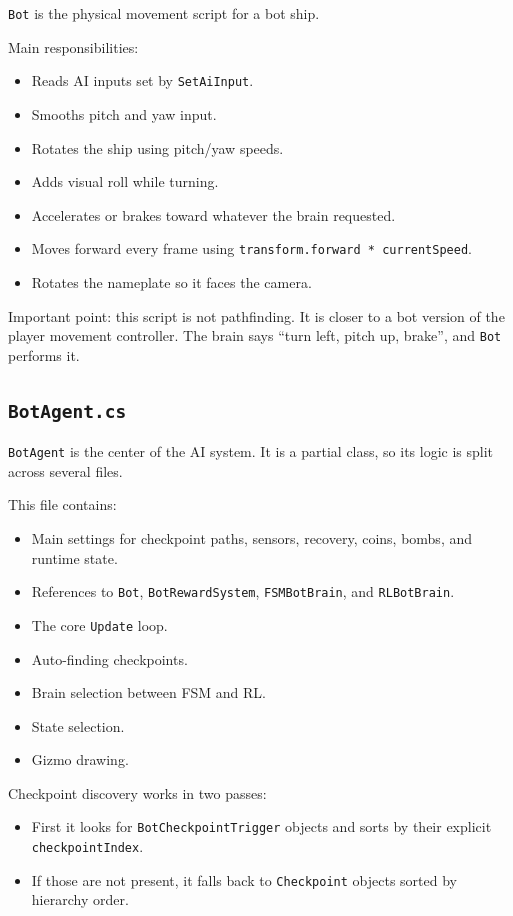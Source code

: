 \documentclass[11pt]{article}
\newcommand{\file}[1]{\texttt{#1}}
\newcommand{\code}[1]{{\footnotesize\texttt{#1}}}
\begin{document}
\code{Bot} is the physical movement script for a bot ship.

Main responsibilities:

\begin{itemize}
    \item Reads AI inputs set by \code{SetAiInput}.
    \item Smooths pitch and yaw input.
    \item Rotates the ship using pitch/yaw speeds.
    \item Adds visual roll while turning.
    \item Accelerates or brakes toward whatever the brain requested.
    \item Moves forward every frame using \code{transform.forward * currentSpeed}.
    \item Rotates the nameplate so it faces the camera.
\end{itemize}

Important point: this script is not pathfinding. It is closer to a bot version of the player movement controller. The brain says ``turn left, pitch up, brake'', and \code{Bot} performs it.

\subsection{\file{BotAgent.cs}}

\code{BotAgent} is the center of the AI system. It is a partial class, so its logic is split across several files.

This file contains:

\begin{itemize}
    \item Main settings for checkpoint paths, sensors, recovery, coins, bombs, and runtime state.
    \item References to \code{Bot}, \code{BotRewardSystem}, \code{FSMBotBrain}, and \code{RLBotBrain}.
    \item The core \code{Update} loop.
    \item Auto-finding checkpoints.
    \item Brain selection between FSM and RL.
    \item State selection.
    \item Gizmo drawing.
\end{itemize}

Checkpoint discovery works in two passes:

\begin{itemize}
    \item First it looks for \code{BotCheckpointTrigger} objects and sorts by their explicit \code{checkpointIndex}.
    \item If those are not present, it falls back to \code{Checkpoint} objects sorted by hierarchy order.
\end{itemize}
\end{document}
